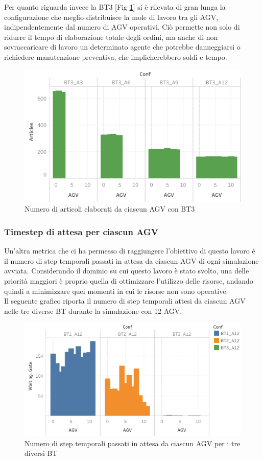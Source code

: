 \documentclass[12pt]{article}
\begin{document}
\noindent Per quanto riguarda invece la BT3 [Fig \ref{fig:articles_agv_bt3}] si è rilevata di gran lunga la configurazione che meglio distribuisce la mole di lavoro tra gli AGV, indipendentemente dal numero di AGV operativi. Ciò permette non solo di ridurre il tempo di elaborazione totale degli ordini, ma anche di non sovraccaricare di lavoro un determinato agente che potrebbe danneggiarsi o richiedere manutenzione preventiva, che implicherebbero soldi e tempo.
 
\begin{figure}[H]
\centering
  \includegraphics[width=0.8\linewidth]{Figures/Results_Graphics/Articles_BT3.png}
  \caption{Numero di articoli elaborati da ciascun AGV con BT3}\label{fig:articles_agv_bt3}
\end{figure}

\newpage

\subsubsection{Timestep di attesa per ciascun AGV}
Un'altra metrica che ci ha permesso di raggiungere l'obiettivo di questo lavoro è il numero di step temporali passati in attesa da ciascun AGV di ogni simulazione avviata. Considerando il dominio su cui questo lavoro è stato svolto, una delle priorità maggiori è proprio quella di ottimizzare l'utilizzo delle risorse, andando quindi a minimizzare quei momenti in cui le risorse non sono operative. \\

\noindent Il seguente grafico riporta il numero di step temporali attesi da ciascun AGV nelle tre diverse BT durante la simulazione con 12 AGV.
\begin{figure}[H]
\centering
  \includegraphics[width=1\linewidth]{Figures/Results_Graphics/Waiting.png}
  \caption{Numero di step temporali passati in attesa da ciascun AGV per i tre diversi BT}\label{fig:waiting_bt_a12}
\end{figure}
\end{document}
